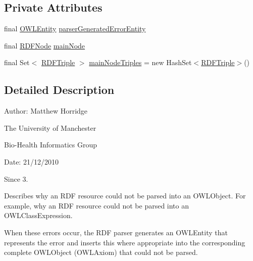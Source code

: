 \subsection*{Private Attributes}
\begin{DoxyCompactItemize}
\item 
final \hyperlink{interfaceorg_1_1semanticweb_1_1owlapi_1_1model_1_1_o_w_l_entity}{O\-W\-L\-Entity} \hyperlink{classorg_1_1semanticweb_1_1owlapi_1_1io_1_1_r_d_f_resource_parse_error_aa023431539ae6f94f2891d39069b9077}{parser\-Generated\-Error\-Entity}
\item 
final \hyperlink{classorg_1_1semanticweb_1_1owlapi_1_1io_1_1_r_d_f_node}{R\-D\-F\-Node} \hyperlink{classorg_1_1semanticweb_1_1owlapi_1_1io_1_1_r_d_f_resource_parse_error_a3a96338edbf7db4580077db253b53d8a}{main\-Node}
\item 
final Set$<$ \hyperlink{classorg_1_1semanticweb_1_1owlapi_1_1io_1_1_r_d_f_triple}{R\-D\-F\-Triple} $>$ \hyperlink{classorg_1_1semanticweb_1_1owlapi_1_1io_1_1_r_d_f_resource_parse_error_a97dde1a706753351cb7df4522ba3203c}{main\-Node\-Triples} = new Hash\-Set$<$\hyperlink{classorg_1_1semanticweb_1_1owlapi_1_1io_1_1_r_d_f_triple}{R\-D\-F\-Triple}$>$()
\end{DoxyCompactItemize}


\subsection{Detailed Description}
Author\-: Matthew Horridge\par
 The University of Manchester\par
 Bio-\/\-Health Informatics Group\par
 Date\-: 21/12/2010 \begin{DoxySince}{Since}
3. \par
 Describes why an R\-D\-F resource could not be parsed into an {\ttfamily O\-W\-L\-Object}. For example, why an R\-D\-F resource could not be parsed into an {\ttfamily O\-W\-L\-Class\-Expression}. \par
 When these errors occur, the R\-D\-F parser generates an {\ttfamily O\-W\-L\-Entity} that represents the error and inserts this where appropriate into the corresponding complete O\-W\-L\-Object (O\-W\-L\-Axiom) that could not be parsed. 
\end{DoxySince}


